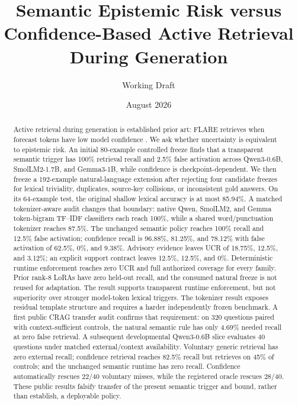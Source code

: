 \documentclass[11pt]{article}
\title{Semantic Epistemic Risk versus Confidence-Based Active Retrieval During Generation}
\author{Working Draft}\date{August 2026}
\begin{document}
\maketitle

\begin{abstract}
Active retrieval during generation is established prior art: FLARE retrieves
when forecast tokens have low model confidence \cite{flare}. We ask whether
uncertainty is equivalent to epistemic risk. An initial 80-example controlled
freeze finds that a transparent semantic trigger has 100\% retrieval recall and
2.5\% false activation across Qwen3-0.6B, SmolLM2-1.7B, and Gemma3-1B, while
confidence is checkpoint-dependent. We then freeze a 192-example natural-language
extension after rejecting four candidate freezes for lexical triviality,
duplicates, source-key collisions, or inconsistent gold answers. On its
64-example test, the original shallow lexical
accuracy is at most 85.94\%. A matched tokenizer-aware audit changes that
boundary: native Qwen, SmolLM2, and Gemma token-bigram TF--IDF classifiers each
reach 100\%, while a shared word/punctuation tokenizer reaches 87.5\%. The
unchanged semantic policy reaches 100\% recall
and 12.5\% false activation; confidence recall is 96.88\%, 81.25\%, and 78.12\%
with false activation of 62.5\%, 0\%, and 9.38\%. Advisory evidence leaves UCR
of 18.75\%, 12.5\%, and 3.12\%; an explicit support contract leaves 12.5\%,
12.5\%, and 0\%. Deterministic runtime enforcement reaches zero UCR and full
authorized coverage for every family. Prior rank-8 LoRAs have zero held-out
recall, and the consumed natural freeze is not reused for adaptation. The result
supports transparent runtime enforcement, but not superiority over stronger
model-token lexical triggers. The tokenizer result exposes residual template
structure and requires a harder independently frozen benchmark. A first public
CRAG transfer audit confirms that requirement: on 320 questions paired with
context-sufficient controls, the natural semantic rule has only 4.69\% needed
recall at zero false retrieval. A subsequent developmental Qwen3-0.6B slice
evaluates 40 questions under matched external/context availability. Voluntary
generic retrieval has zero external recall; confidence retrieval reaches 82.5\%
recall but retrieves on 45\% of controls; and the unchanged semantic runtime has
zero recall. Confidence automatically rescues 22/40 voluntary misses, while the
registered oracle rescues 28/40. These public results falsify transfer of the
present semantic trigger and bound, rather than establish, a deployable policy.
\end{abstract}
\end{document}
